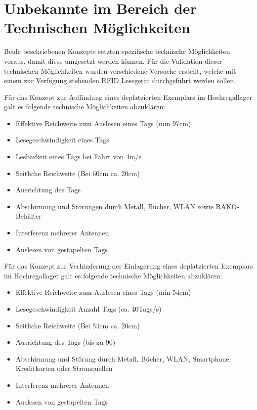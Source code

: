 \section{Unbekannte im Bereich der Technischen Möglichkeiten}
Beide beschriebenen Konzepte setzten spezifische technische Möglichkeiten voraus, damit diese umgesetzt werden können. Für die Validation dieser technischen Möglichkeiten wurden verschiedene Versuche erstellt, welche mit einem zur Verfügung stehenden RFID Lesegerät durchgeführt werden sollen.

Für das Konzept zur Auffindung eines deplatzierten Exemplars im Hochregallager galt es folgende technische Möglichkeiten abzuklären:

\begin{itemize}
	\item Effektive Reichweite zum Auslesen eines Tags (min 97cm)
	\item Lesegeschwindigkeit eines Tags
	\item Lesbarkeit eines Tags bei Fahrt von 4m/s
	\item Seitliche Reichweite (Bei 60cm ca. 20cm)
	\item Ausrichtung des Tags
	\item Abschirmung und Störungen durch Metall, Bücher, WLAN sowie RAKO-Behälter
	\item Interferenz mehrerer Antennen
	\item Auslesen von gestapelten Tags
\end{itemize}

Für das Konzept zur Verhinderung der Einlagerung eines deplatzierten Exemplars im Hochregallager galt es folgende technische Möglichkeiten abzuklären:
\begin{itemize}
	\item Effektive Reichweite zum Auslesen eines Tags (min 54cm)
	\item Lesegeschwindigkeit Anzahl Tags (ca. 40Tags/s)
	\item Seitliche Reichweite (Bei 54cm ca. 20cm)
	\item Ausrichtung des Tags (bis zu 90\SIUnitSymbolDegree)
	\item Abschirmung und Störung durch Metall, Bücher, WLAN, Smartphone, Kreditkarten oder Stromquellen
	\item Interferenz mehrerer Antennen
	\item Auslesen von gestapelten Tags
\end{itemize}

